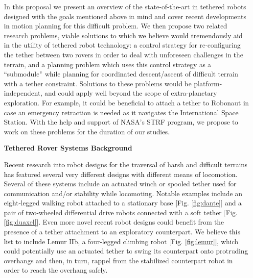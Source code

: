 \documentclass[12pt]{article}
\begin{document}
In this proposal we present an overview of the state-of-the-art in tethered robots designed with the goals 
mentioned above in mind and cover recent developments in motion planning for this difficult problem. 
We then propose two related research problems, viable solutions to which we believe would tremendously aid 
in the utility of tethered robot technology: a control strategy for re-configuring the tether between two 
rovers in order to deal with unforeseen challenges in the terrain, and a planning problem which uses this 
control strategy as a ``submodule'' while planning for coordinated descent/ascent of difficult terrain with 
a tether constraint. Solutions to these problems would be platform-independent, and could 
apply well beyond the scope of extra-planetary exploration. For example, it could be beneficial to attach a 
tether to Robonaut in case an emergency retraction is needed as it navigates the International Space Station. 
With the help and support of NASA's STRF program, we propose to work on these problems for the duration of our 
studies. 



{\bf\noindent Tethered Rover Systems Background}

Recent research into robot designs for the traversal of harsh and difficult terrains 
has featured several very different designs with different means of locomotion. Several of these systems 
include an actuated winch or spooled tether used for communication and/or stability while locomoting. 
Notable examples include an eight-legged walking robot attached to a stationary base [Fig. \ref{fig:dante}] and a pair of 
two-wheeled differential drive robots connected with a soft tether [Fig. \ref{fig:duaxel}]. Even more novel recent 
robot designs could benefit from the presence of a tether attachment to an exploratory counterpart. We believe 
this list to include Lemur IIb, a four-legged climbing robot [Fig. \ref{fig:lemur}], which could potentially use an actuated 
tether to swing its counterpart onto protruding overhangs and then, in turn, rappel from the stabilized counterpart robot 
in order to reach the overhang safely.
\end{document}
